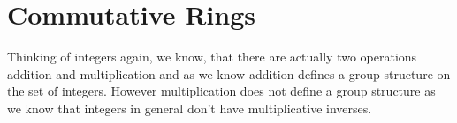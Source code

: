 


\section{Commutative Rings}
Thinking of integers again, we know, that there are actually two operations addition and multiplication and as we know addition defines a group structure on the set of integers. However multiplication does not define a group structure as we know that integers in general don't have multiplicative inverses.

